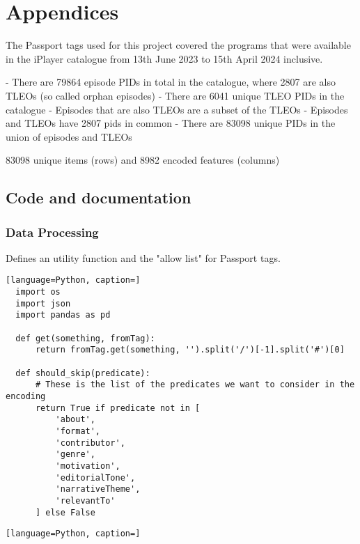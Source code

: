 \section{Appendices}

The Passport tags used for this project covered the programs that were available in the iPlayer catalogue
from 13th June 2023 to 15th April 2024 inclusive.

- There are 79864 episode PIDs in total in the catalogue, where 2807 are also TLEOs (so called orphan episodes)
- There are 6041 unique TLEO PIDs in the catalogue
- Episodes that are also TLEOs are a subset of the TLEOs
- Episodes and TLEOs have 2807 pids in common
- There are 83098 unique PIDs in the union of episodes and TLEOs

83098 unique items (rows) and 8982 encoded features (columns)

\subsection{Code and documentation}

\subsubsection{Data Processing}

Defines an utility function and the "allow list" for Passport tags.

\begin{lstlisting}[language=Python, caption=]
  import os
  import json
  import pandas as pd

  def get(something, fromTag):
      return fromTag.get(something, '').split('/')[-1].split('#')[0]

  def should_skip(predicate):
      # These is the list of the predicates we want to consider in the encoding
      return True if predicate not in [
          'about',
          'format',
          'contributor',
          'genre',
          'motivation',
          'editorialTone',
          'narrativeTheme',
          'relevantTo'
      ] else False
\end{lstlisting}

\begin{lstlisting}[language=Python, caption=]
\end{lstlisting}

